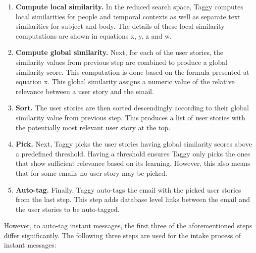 \begin{enumerate}
	\item \textbf{Compute local similarity.} In the reduced search space, Taggy computes local similarities for people and temporal contexts as well as separate text similarities for subject and body. The details of these local similarity computations are shown in equations x, y, z and w. 
	
	\item \textbf{Compute global similarity.} Next, for each of the user stories, the similarity values from previous step are combined to produce a global similarity score. This computation is done based on the formula presented at equation x. This global similarity assigns a numeric value of the relative relevance between a user story and the email.
	
	\item \textbf{Sort.} The user stories are then sorted descendingly according to their global similarity value from previous step. This produces a list of user stories with the potentially most relevant user story at the top.
	
	\item \textbf{Pick.} Next, Taggy picks the user stories having global similarity scores above a predefined threshold. Having a threshold ensures Taggy only picks the ones that show sufficient relevance based on its learning. However, this also means that for some emails no user story may be picked.
	
	\item \textbf{Auto-tag.}	Finally, Taggy auto-tags the email with the picked user stories from the last step. This step adds database level links between the email and the user stories to be auto-tagged.
\end{enumerate}

However, to auto-tag instant messages, the first three of the aforementioned steps differ significantly. The following three steps are used for the intake process of instant messages:

